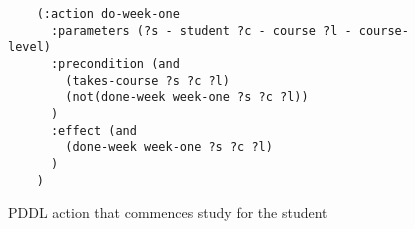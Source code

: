 \begin{figure}[t]
    \begin{lstlisting}
    (:action do-week-one
      :parameters (?s - student ?c - course ?l - course-level)
      :precondition (and 
        (takes-course ?s ?c ?l)
        (not(done-week week-one ?s ?c ?l))
      )
      :effect (and 
        (done-week week-one ?s ?c ?l)
      )
    )
    \end{lstlisting}
    \caption{PDDL action that commences study for the student}\label{fig:do-week-one}
\end{figure}